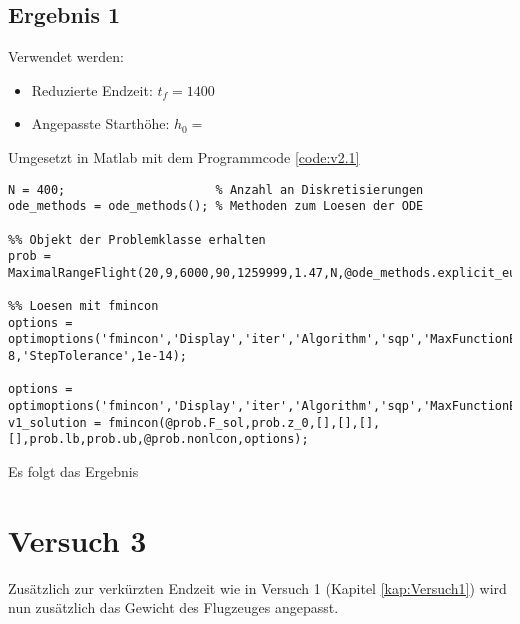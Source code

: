\subsection{Ergebnis 1}
Verwendet werden:
\begin{itemize}
\item Reduzierte Endzeit: $t_f = 1400$
\item Angepasste Starthöhe: $h_0 = $
\end{itemize}
Umgesetzt in Matlab mit dem Programmcode \ref{code:v2.1}
\begin{lstlisting}[style=num_octave, caption={Matlab Programmcode für Versuch 2.}, label=code:v2.1]
N = 400;                     % Anzahl an Diskretisierungen
ode_methods = ode_methods(); % Methoden zum Loesen der ODE

%% Objekt der Problemklasse erhalten
prob = MaximalRangeFlight(20,9,6000,90,1259999,1.47,N,@ode_methods.explicit_euler);

%% Loesen mit fmincon
options = optimoptions('fmincon','Display','iter','Algorithm','sqp','MaxFunctionEvaluations',4000.0e+03,'MaxIterations',4.0e+05,'ConstraintTolerance',1e-8,'StepTolerance',1e-14);

options = optimoptions('fmincon','Display','iter','Algorithm','sqp','MaxFunctionEvaluations',1.000e+03,'MaxIterations',4.0e+05);
v1_solution = fmincon(@prob.F_sol,prob.z_0,[],[],[],[],prob.lb,prob.ub,@prob.nonlcon,options);
\end{lstlisting}

Es folgt das Ergebnis
 








\newpage
\section{Versuch 3}
Zusätzlich zur verkürzten Endzeit wie in Versuch 1 (Kapitel \ref{kap:Versuch1}) wird nun zusätzlich das Gewicht des Flugzeuges angepasst.

